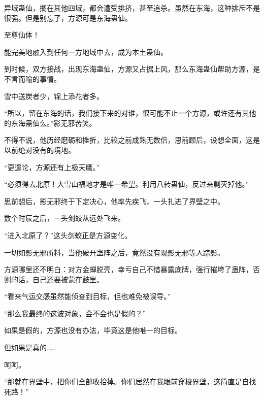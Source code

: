 \begin{this_body}
异域蛊仙，搁在其他四域，都会遭受排挤，甚至追杀。虽然在东海，这种排斥不是很强。但是别忘了，方源可是东海蛊仙。

至尊仙体！

能完美地融入到任何一方地域中去，成为本土蛊仙。

到时候，双方接战，出现东海蛊仙，方源又占据上风，那么东海蛊仙帮助方源，是不言而喻的事情。

雪中送炭者少，锦上添花者多。

“所以，留在东海的话，我们接下来的对谁，很可能不止一个方源，或许还有其他的东海蛊仙么。”影无邪苦笑。

不得不说，他历经磨砺和挫折，比较之前成熟无数倍，思前顾后，设想全面，这是以前绝对没有的境地。

“更遑论，方源还有上极天鹰。”

“必须得去北原！大雪山福地才是唯一希望。利用八转蛊仙，反过来剿灭掉他。”

思前想后，影无邪终于下定决心，他率先疾飞，一头扎进了界壁之中。

数个时辰之后，一头剑蛟从远处飞来。

“进入北原了？”这头剑蛟正是方源变化。

一切如影无邪所料，当他破开蛊阵之后，竟然没有现影无邪等人踪影。

方源哪里还不明白：对方金蝉脱壳，幸亏自己不惜暴露底牌，强行摧垮了蛊阵，否则的话，自己还要被蒙在鼓里。

“看来气运交感虽然能侦查到目标，但也难免被误导。”

“那么我最终的这波对象，会不会也是假的？”

如果是假的，方源也没有办法，毕竟这是他唯一的目标。

但如果是真的……

呵呵。

“那就在界壁中，把你们全部收拾掉。你们居然在我眼前穿梭界壁，这简直是自找死路！”

\end{this_body}

